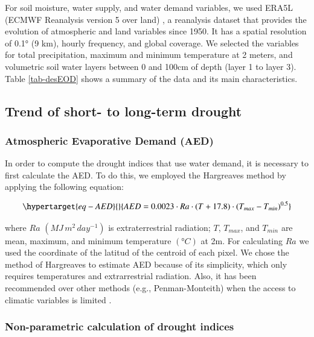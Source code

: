 \documentclass[
  authoryear,
  preprint,
  3p,
  onecolumn]{elsarticle}
\begin{document}
For soil moisture, water supply, and water demand variables, we used
ERA5L (ECMWF Reanalysis version 5 over land) \citep{MunozSabater2021}, a
reanalysis dataset that provides the evolution of atmospheric and land
variables since 1950. It has a spatial resolution of 0.1° (9 km), hourly
frequency, and global coverage. We selected the variables for total
precipitation, maximum and minimum temperature at 2 meters, and
volumetric soil water layers between 0 and 100cm of depth (layer 1 to
layer 3). Table \ref{tab-desEOD} shows a summary of the data and its
main characteristics.

\hypertarget{trend-of-short--to-long-term-drought}{%
\subsection{Trend of short- to long-term
drought}\label{trend-of-short--to-long-term-drought}}

\hypertarget{atmospheric-evaporative-demand-aed}{%
\subsubsection{Atmospheric Evaporative Demand
(AED)}\label{atmospheric-evaporative-demand-aed}}

In order to compute the drought indices that use water demand, it is
necessary to first calculate the AED. To do this, we employed the
Hargreaves method \citep{Hargreaves1994, Hargreaves1985} by applying the
following equation:

\begin{equation}\protect\hypertarget{eq-AED}{}{AED = 0.0023\cdot Ra\cdot (T+17.8)\cdot (T_{max}-T_{min})^{0.5}}\label{eq-AED}\end{equation}

where \(Ra\) \((MJ\,m^2\, day^{-1})\) is extraterrestrial radiation;
\(T\), \(T_{max}\), and \(T_{min}\) are mean, maximum, and minimum
temperature \((°C)\) at 2m. For calculating \(Ra\) we used the
coordinate of the latitud of the centroid of each pixel. We chose the
method of Hargreaves to estimate AED because of its simplicity, which
only requires temperatures and extrarrestrial radiation. Also, it has
been recommended over other methods (e.g., Penman-Monteith) when the
access to climatic variables is limited \citep{Vicente-Serrano2014}.

\hypertarget{non-parametric-calculation-of-drought-indices}{%
\subsubsection{Non-parametric calculation of drought
indices}\label{non-parametric-calculation-of-drought-indices}}
\end{document}
